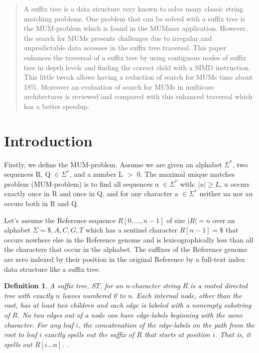 \documentclass[conference]{IEEEtran}
\begin{document}

\maketitle

\begin{abstract}
 A suffix tree is a data structure very known to solve many classic string matching problems. One problem that can be solved with a suffix tree is the MUM-problem which is found in the MUMmer application. However, the search for MUMs presents challenges due to irregular and unpredictable data accesses in the suffix tree traversal. This paper enhances the traversal of a suffix tree by using contiguous nodes of suffix tree in depth levels and finding the correct child with a SIMD instruction. This little tweak allows having a reduction of search for MUMs time about 18\%. Moreover an evaluation of search for MUMs in multicore architectures is reviewed and compared with this enhanced traversal which has a better speedup.
\end{abstract}
\IEEEpeerreviewmaketitle

\section{Introduction}
Firstly, we define the MUM-problem. Assume we are given an alphabet $\Sigma^*$, two sequences R, Q $\in \Sigma^*$, and a number L $>$ 0. The maximal unique matches problem (MUM-problem) is to find all sequences u $\in \Sigma^*$ with: $|u|\geq L$, u occurs exactly once in R and once in Q, and for any character a $\in \Sigma^*$ neither ua nor au occurs both in R and Q.

Let's assume the Reference sequence $R[0,\ldots, n-1]$ of size $|R|=n$ over an alphabet $\Sigma={ \$, A, C, G, T}$ which has a sentinel character $R[n-1] = \$$ that occurs nowhere else in the Reference genome and is lexicographically less than all the characters that occur in the alphabet. The suffixes of the Reference genome are zero indexed by their position in the original Reference by a full-text index data structure like a suffix tree. 

\newtheorem{mydef}{Definition}
\begin{mydef}
A suffix tree, $ST$, for an n-character string $R$ is a rooted directed tree with exactly $n$ leaves numbered 0 to n. Each internal node, other than the root, has at least two children and each edge is labeled with a nonempty substring of $R$. No two edges out of a node can have edge-labels beginning with the same character. For any leaf $i$, the concatenation of the edge-labels on the path from the root to leaf $i$ exactly spells out the suffix of $R$ that starts at position $i$. That is, it spells out $R[i\ldots n]$. \cite{Gusfield1997}.
\end{mydef}
\end{document}
